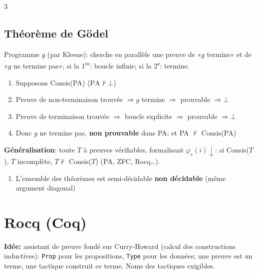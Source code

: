 \documentclass[12pt, a4paper]{article}
\newcommand{\dv}{{\downarrow}}
\newcommand{\ff}{\varphi}
\begin{document}
\begin{multicols*}{3}
	\subsection{Théorème de Gödel}
	Programme $g$ (par Kleene): cherche en parallèle une preuve de «$g$ termine» et de «$g$ ne termine pas»; si la 1\textsuperscript{re}: boucle infinie; si la 2\textsuperscript{e}: termine.
	\begin{enumerate}[\roman*.]
		\item Supposons Consis(PA) ($\text{PA}\nvdash\bot$)
		\item Preuve de non-terminaison trouvée $\Rightarrow g$ termine $\Rightarrow$ prouvable $\Rightarrow\bot$
		\item Preuve de terminaison trouvée $\Rightarrow$ boucle explicite $\Rightarrow$ prouvable $\Rightarrow\bot$
		\item Donc $g$ ne termine pas, \textbf{non prouvable} dans PA; et PA $\nvdash$ Consis(PA)
	\end{enumerate}
	\textbf{Généralisation}: toute $T$ à preuves vérifiables, formalisant $\ff_e(i)\dv$: si Consis($T$), $T$ incomplète, $T\nvdash$ Consis($T$) (PA, ZFC, Rocq…).
	\begin{enumerate}[\roman*.]
		\item L'ensemble des théorèmes est semi-décidable \textbf{non décidable} (même argument diagonal)
	\end{enumerate}

	\colbreak
	\section{Rocq (Coq)}
	\textbf{Idée:} assistant de preuve fondé sur Curry-Howard (calcul des constructions inductives): \texttt{Prop} pour les propositions, \texttt{Type} pour les données; une preuve est un terme, une tactique construit ce terme. Noms des tactiques exigibles.


\end{multicols*}
\end{document}
